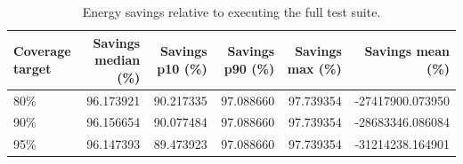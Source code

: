 \begin{table}[t]
\centering
\caption{Energy savings relative to executing the full test suite.}
\label{tab:energy_savings_full}
\begin{tabular}{lrrrrr}
\toprule
Coverage target & Savings median (\%) & Savings p10 (\%) & Savings p90 (\%) & Savings max (\%) & Savings mean (\%) \\
\midrule
80\% & 96.173921 & 90.217335 & 97.088660 & 97.739354 & -27417900.073950 \\
90\% & 96.156654 & 90.077484 & 97.088660 & 97.739354 & -28683346.086084 \\
95\% & 96.147393 & 89.473923 & 97.088660 & 97.739354 & -31214238.164901 \\
\bottomrule
\end{tabular}

\end{table}